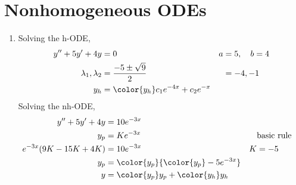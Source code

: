\section{Nonhomogeneous ODEs}


\begin{enumerate}
    \item Solving the h-ODE,
          \begin{align}
              y'' + 5y' + 4y           & = 0                                      &
              a                        & = 5, \quad b = 4                           \\
              \lambda_{1}, \lambda_{2} & = \frac{-5 \pm \sqrt{9}}{2}              &
                                       & = -4, -1                                   \\
              y_{h}                    & = \color{y_h} c_{1}e^{-4x} + c_{2}e^{-x}
          \end{align}
          Solving the nh-ODE,
          \begin{align}
              y'' + 5y' + 4y         & = 10e^{-3x}                                   \\
              y_{p}                  & = Ke^{-3x}                                  &
                                     & \text{basic rule}                             \\
              e^{-3x}(9K - 15K + 4K) & = 10e^{-3x}                                 &
              K                      & = -5                                          \\
              y_{p}                  & = \color{y_p} {\color{y_p} -5e^{-3x}}         \\
              y                      & = {\color{y_p} y_{p}} + {\color{y_h} y_{h}}
          \end{align}


\end{enumerate}
